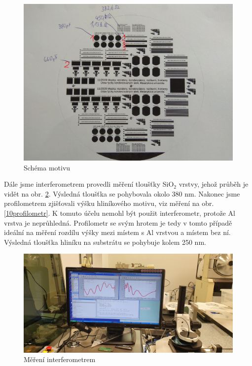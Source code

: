 \documentclass[a4paper,12pt]{article}
\begin{document}
\begin{figure}[h!]
	\centering
	\includegraphics[width=130mm]{mereni.jpg}
	\caption{Schéma motivu}
	\label{mereni}
\end{figure}

\newpage
 Dále jsme interferometrem provedli měření tloušťky SiO$_2$ vrstvy, jehož průběh je vidět na obr. \ref{9interferometr}. Výsledná tloušťka se pohybovala okolo 380 \si{\nano\meter}. Nakonec jsme profilometrem zjišťovali výšku hliníkového motivu, viz měření na obr. \ref{10profilometr}. K tomuto účelu nemohl být použit interferometr, protože Al vrstva je neprůhledná. Profilometr se svým hrotem je tedy v tomto případě ideální na měření rozdílu výšky mezi místem s Al vrstvou a místem bez ní. Výsledná tloušťka hliníku na substrátu se pohybuje kolem 250 \si{\nano\meter}.
 
\begin{figure}[h!]
	\centering
	\includegraphics[width=130mm]{9interferometr.jpg}
	\caption{Měření interferometrem}
	\label{9interferometr}
\end{figure}
\end{document}
